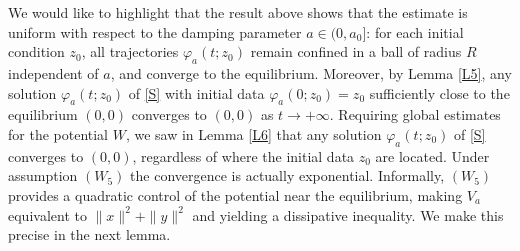 \documentclass[12pt]{amsart}
\numberwithin{equation}{section}
\begin{document}
We would like to highlight that the result above shows that the estimate is uniform with respect to the damping parameter $a\in(0,a_0]$: for each initial condition $z_0$, all trajectories $\varphi_a(t;z_0)$ remain confined in a ball of radius $R$ independent of $a$, and converge to the equilibrium. Moreover, by Lemma \ref{L5}, any solution $\varphi_a(t;z_0)$ of \eqref{S} with initial data $\varphi_a(0;z_0)=z_0$ sufficiently close to the equilibrium $(0,0)$ converges to $(0,0)$ as $t\to+\infty$. Requiring global estimates for the potential $W$, we saw in Lemma \ref{L6} that any solution $\varphi_a(t;z_0)$ of \eqref{S} converges to $(0,0)$, regardless of where the initial data $z_0$ are located. Under assumption \hyperlink{W5}{$(W_5)$} the convergence is actually exponential. Informally, \hyperlink{W5}{$(W_5)$} provides a quadratic control of the potential near the equilibrium, making $V_a$ equivalent to $\|x\|^2+\|y\|^2$ and yielding a dissipative inequality. We make this precise in the next lemma.
\end{document}
